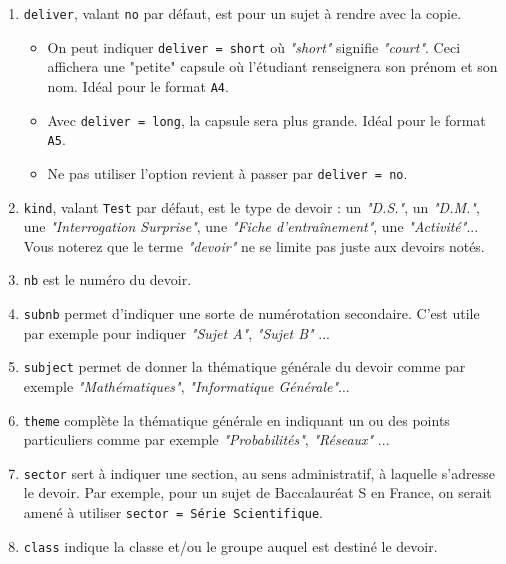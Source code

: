 \documentclass[12pt,a4paper]{scrartcl}
\theoremstyle{definition}
\begin{document}
\begin{enumerate}
    \item \verb+deliver+, valant \verb+no+ par défaut, est pour un sujet à rendre avec la copie.
    \begin{itemize}
        \setlength\itemsep{0em}

        \item On peut indiquer \verb+deliver = short+ où \emph{"short"} signifie \emph{"court"}. Ceci affichera une "petite" capsule où l'étudiant renseignera son prénom et son nom. Idéal pour le format \verb+A4+.

        \item Avec \verb+deliver = long+, la capsule sera plus grande. Idéal pour le format \verb+A5+.

        \item Ne pas utiliser l'option revient à passer par \verb+deliver = no+.
    \end{itemize}

    \item \verb+kind+, valant \verb+Test+ par défaut, est le type de devoir : un \emph{"D.S."}, un \emph{"D.M."}, une \emph{"Interrogation Surprise"}, une \emph{"Fiche d'entraînement"}, une \emph{"Activité"}...
    Vous noterez que le terme \emph{"devoir"} ne se limite pas juste aux devoirs notés.

    \item \verb+nb+ est le numéro du devoir.

    \item \verb+subnb+ permet d'indiquer une sorte de numérotation secondaire. C'est utile par exemple pour indiquer \emph{"Sujet A"}, \emph{"Sujet B"} ...

    \item \verb+subject+ permet de donner la thématique générale du devoir comme par exemple \emph{"Mathématiques"}, \emph{"Informatique Générale"}...

    \item \verb+theme+ complète la thématique générale en indiquant un ou des points particuliers comme par exemple \emph{"Probabilités"}, \emph{"Réseaux"} ...

    \item \verb+sector+ sert à indiquer une section, au sens administratif, à laquelle s'adresse le devoir. Par exemple, pour un sujet de Baccalauréat S en France, on serait amené à utiliser \verb+sector = Série Scientifique+.

    \item \verb+class+ indique la classe et/ou le groupe auquel est destiné le devoir.


\end{enumerate}
\end{document}
